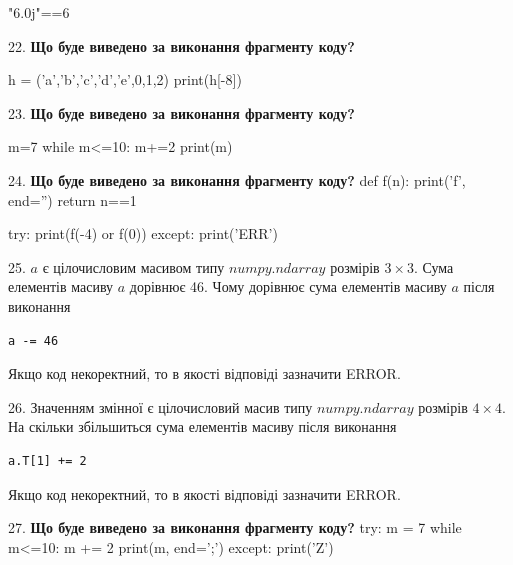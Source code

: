\documentclass[11pt]{article}
\begin{document}
"6.0j"==6
\par\vspace{5mm}

22. \textbf{Що буде виведено за виконання фрагменту коду?}

h = ('a','b','c','d','e',0,1,2)
print(h[-8])

\par\vspace{5mm}

23. \textbf{Що буде виведено за виконання фрагменту коду?}

m=7
while m<=10:
    m+=2
print(m)

\par\vspace{5mm}

24. \textbf{Що буде виведено за виконання фрагменту коду?}
def f(n):
    print('f', end='')
    return n==1

try:
    print(f(-4) or f(0))
except:
    print('ERR')
\par\vspace{5mm}

25. 
$a$ є цілочисловим масивом типу $numpy.ndarray$ розмірів $3{\times}3$. Сума елементів масиву $a$ дорівнює 46. Чому дорівнює сума елементів масиву $a$ після виконання 
\begin{verbatim}
a -= 46
\end{verbatim}


Якщо код некоректний, то в якості відповіді зазначити ERROR.


\par\vspace{5mm}

26. 
Значенням змінної  є цілочисловий масив типу $numpy.ndarray$ розмірів $4{\times}4$. На скільки збільшиться сума елементів масиву  після виконання
\begin{verbatim}
a.T[1] += 2
\end{verbatim}


Якщо код некоректний, то в якості відповіді зазначити ERROR.


\par\vspace{5mm}

27. \textbf{Що буде виведено за виконання фрагменту коду?}
try:
    m = 7
    while m<=10:
        m += 2
    print(m, end=';')
except:
    print('Z')
\par\vspace{5mm}
\end{document}
